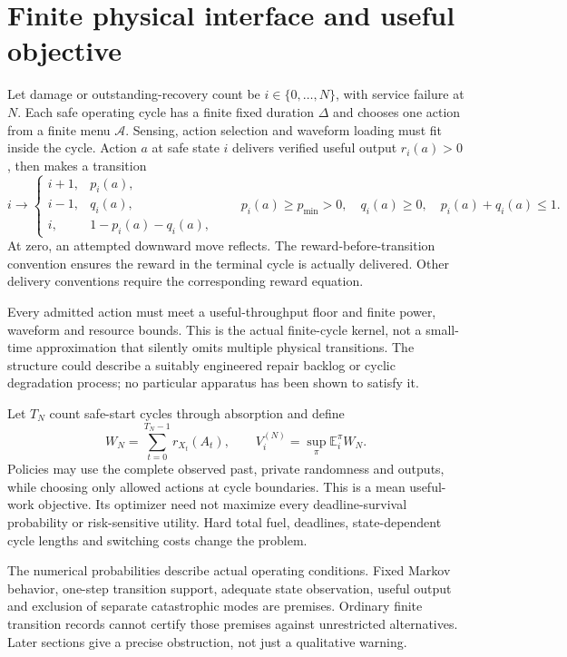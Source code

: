 \documentclass[10pt,a4paper]{article}
\newcommand{\E}{\mathbb E}\newcommand{\Pp}{\mathbb P}
\begin{document}
\section{Finite physical interface and useful objective}

Let damage or outstanding-recovery count be $i\in\{0,\ldots,N\}$, with service failure at $N$. Each safe operating cycle has a finite fixed duration $\Delta$ and chooses one action from a finite menu $\mathcal A$. Sensing, action selection and waveform loading must fit inside the cycle. Action $a$ at safe state $i$ delivers verified useful output $r_i(a)>0$, then makes a transition
\begin{equation}
i\longrightarrow\begin{cases}i+1,&p_i(a),\\i-1,&q_i(a),\\i,&1-p_i(a)-q_i(a),\end{cases}
\qquad p_i(a)\ge p_{\min}>0,\quad q_i(a)\ge0,\quad p_i(a)+q_i(a)\le1 .
\label{eq:kernel}
\end{equation}
At zero, an attempted downward move reflects. The reward-before-transition convention ensures the reward in the terminal cycle is actually delivered. Other delivery conventions require the corresponding reward equation.

Every admitted action must meet a useful-throughput floor and finite power, waveform and resource bounds. This is the actual finite-cycle kernel, not a small-time approximation that silently omits multiple physical transitions. The structure could describe a suitably engineered repair backlog or cyclic degradation process; no particular apparatus has been shown to satisfy it.

Let $T_N$ count safe-start cycles through absorption and define
\begin{equation}
W_N=\sum_{t=0}^{T_N-1}r_{X_t}(A_t),\qquad
V_i^{(N)}=\sup_\pi\E_i^\pi W_N .
\label{eq:objective}
\end{equation}
Policies may use the complete observed past, private randomness and outputs, while choosing only allowed actions at cycle boundaries. This is a mean useful-work objective. Its optimizer need not maximize every deadline-survival probability or risk-sensitive utility. Hard total fuel, deadlines, state-dependent cycle lengths and switching costs change the problem.

The numerical probabilities describe actual operating conditions. Fixed Markov behavior, one-step transition support, adequate state observation, useful output and exclusion of separate catastrophic modes are premises. Ordinary finite transition records cannot certify those premises against unrestricted alternatives. Later sections give a precise obstruction, not just a qualitative warning.
\end{document}
